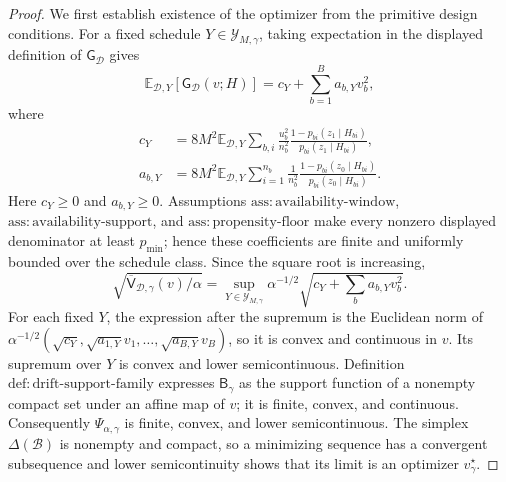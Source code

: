 \documentclass{article}
\begin{document}
\begin{proof}
We first establish existence of the optimizer from the primitive design conditions.  For a fixed schedule \(Y\in\mathcal Y_{M,\gamma}\), taking expectation in the displayed definition of \(\mathsf G_{\mathcal D}\) gives
\[
\mathbb E_{\mathcal D,Y}[\mathsf G_{\mathcal D}(v;H)]
=c_Y+\sum_{b=1}^Ba_{b,Y}v_b^2,
\]
where
\[
\begin{aligned}
c_Y&=8M^2\mathbb E_{\mathcal D,Y}
 \sum_{b,i}\frac{u_b^2}{n_b^2}
 \frac{1-p_{bi}(z_1\mid H_{bi})}{p_{bi}(z_1\mid H_{bi})},\\
a_{b,Y}&=8M^2\mathbb E_{\mathcal D,Y}
 \sum_{i=1}^{n_b}\frac1{n_b^2}
 \frac{1-p_{bi}(z_0\mid H_{bi})}{p_{bi}(z_0\mid H_{bi})}.
\end{aligned}
\]
Here \(c_Y\ge0\) and \(a_{b,Y}\ge0\).  Assumptions \(\mathrm{ass:availability\text{-}window}\), \(\mathrm{ass:availability\text{-}support}\), and \(\mathrm{ass:propensity\text{-}floor}\) make every nonzero displayed denominator at least \(p_{\min}\); hence these coefficients are finite and uniformly bounded over the schedule class.  Since the square root is increasing,
\[
\sqrt{\overline{\mathsf V}_{\mathcal D,\gamma}(v)/\alpha}
=\sup_{Y\in\mathcal Y_{M,\gamma}}
 \alpha^{-1/2}\sqrt{c_Y+\sum_ba_{b,Y}v_b^2}.
\]
For each fixed \(Y\), the expression after the supremum is the Euclidean norm of
\(\alpha^{-1/2}(\sqrt{c_Y},\sqrt{a_{1,Y}}v_1,\ldots,\sqrt{a_{B,Y}}v_B)\), so it is convex and continuous in \(v\).  Its supremum over \(Y\) is convex and lower semicontinuous.  Definition \(\mathrm{def:drift\text{-}support\text{-}family}\) expresses \(\mathsf B_\gamma\) as the support function of a nonempty compact set under an affine map of \(v\); it is finite, convex, and continuous.  Consequently \(\Psi_{\alpha,\gamma}\) is finite, convex, and lower semicontinuous.  The simplex \(\Delta(\mathcal B)\) is nonempty and compact, so a minimizing sequence has a convergent subsequence and lower semicontinuity shows that its limit is an optimizer \(v_\gamma^\star\).


\end{proof}
\end{document}
